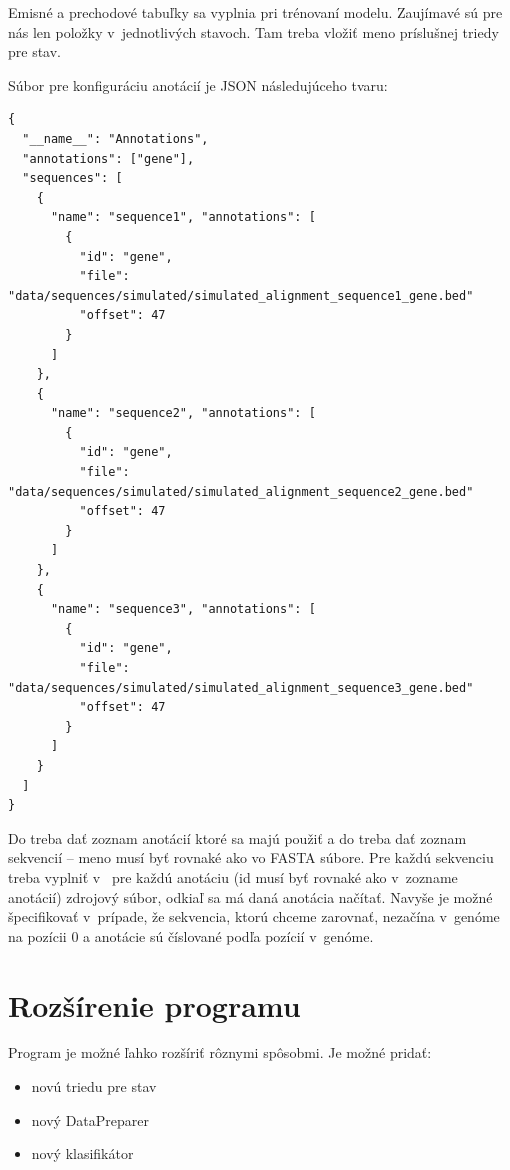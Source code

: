 

Emisné a prechodové tabuľky sa vyplnia pri trénovaní modelu. Zaujímavé sú pre nás len položky  v~jednotlivých stavoch. Tam treba vložiť meno príslušnej triedy pre stav.

Súbor pre konfiguráciu anotácií je JSON následujúceho tvaru:
\begin{lstlisting}
{
  "__name__": "Annotations",
  "annotations": ["gene"],
  "sequences": [
    {
      "name": "sequence1", "annotations": [
        {
          "id": "gene",
          "file": "data/sequences/simulated/simulated_alignment_sequence1_gene.bed"
          "offset": 47
        }
      ]
    },
    {
      "name": "sequence2", "annotations": [
        {
          "id": "gene",
          "file": "data/sequences/simulated/simulated_alignment_sequence2_gene.bed"
          "offset": 47
        }
      ]
    },
    {
      "name": "sequence3", "annotations": [
        {
          "id": "gene",
          "file": "data/sequences/simulated/simulated_alignment_sequence3_gene.bed"
          "offset": 47
        }
      ]
    }
  ]
}
\end{lstlisting}
Do  treba dať zoznam anotácií ktoré sa majú použiť a do  treba dať zoznam sekvencií -- meno musí byť rovnaké ako vo FASTA súbore. Pre každú sekvenciu treba vyplniť v~ pre každú anotáciu (id musí byť rovnaké ako v~zozname anotácií) zdrojový súbor, odkiaľ sa má daná anotácia načítať. Navyše je možné špecifikovať  v~prípade, že sekvencia, ktorú chceme zarovnať, nezačína v~genóme na pozícii 0 a anotácie sú číslované podľa pozícií v~genóme.

\section{Rozšírenie programu}

Program je možné ľahko rozšíriť rôznymi spôsobmi. Je možné pridať:
\begin{itemize}
    \item novú triedu pre stav
    \item nový DataPreparer
    \item nový klasifikátor
\end{itemize}


